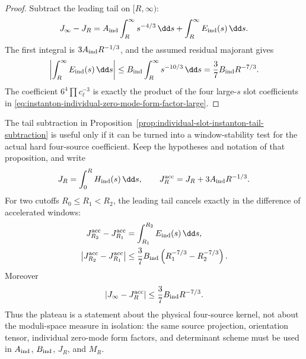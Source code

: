 \begin{proof}
Subtract the leading tail on \([R,\infty)\):
\[
  J_\infty-J_R
  =
  A_{\rm ind}\int_R^\infty s^{-4/3}\,\dd s
  +
  \int_R^\infty E_{\rm ind}(s)\,\dd s .
\]
The first integral is \(3A_{\rm ind}R^{-1/3}\), and the assumed residual
majorant gives
\[
  \left|\int_R^\infty E_{\rm ind}(s)\,\dd s\right|
  \le
  B_{\rm ind}\int_R^\infty s^{-10/3}\,\dd s
  =
  \frac{3}{7}B_{\rm ind}R^{-7/3}.
\]
The coefficient \(6^4\prod c_\ell^{-3}\) is exactly the product of the four
large-\(s\) slot coefficients in
\eqref{eq:instanton-individual-zero-mode-form-factor-large}.
\end{proof}

\begin{controlledapproximation}
\label{ca:instanton-tail-subtracted-hard-window-plateau}
The tail subtraction in
Proposition~\ref{prop:individual-slot-instanton-tail-subtraction} is useful
only if it can be turned into a window-stability test for the actual hard
four-source coefficient.  Keep the hypotheses and notation of that proposition,
and write
\[
  J_R=\int_0^R H_{\rm ind}(s)\,\dd s,
  \qquad
  J_R^{\rm acc}=J_R+3A_{\rm ind}R^{-1/3}.
\]
For two cutoffs \(R_0\le R_1<R_2\), the leading tail cancels exactly in the
difference of accelerated windows:
\begin{equation}
\begin{aligned}
  J_{R_2}^{\rm acc}-J_{R_1}^{\rm acc}
  &=
  \int_{R_1}^{R_2}E_{\rm ind}(s)\,\dd s,\\
  \left|J_{R_2}^{\rm acc}-J_{R_1}^{\rm acc}\right|
  &\le
  \frac{3}{7}B_{\rm ind}
  \left(R_1^{-7/3}-R_2^{-7/3}\right).
\end{aligned}
  \label{eq:tail-subtracted-hard-window-plateau}
\end{equation}
Moreover
\begin{equation}
  \left|J_\infty-J_R^{\rm acc}\right|
  \le
  \frac{3}{7}B_{\rm ind}R^{-7/3}.
  \label{eq:tail-subtracted-hard-window-infinity}
\end{equation}
Thus the plateau is a statement about the physical four-source kernel, not
about the moduli-space measure in isolation: the same source projection,
orientation tensor, individual zero-mode form factors, and determinant scheme
must be used in \(A_{\rm ind}\), \(B_{\rm ind}\), \(J_R\), and \(M_R\).


\end{controlledapproximation}

